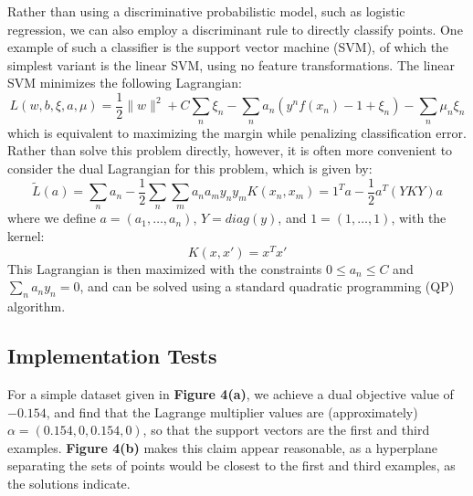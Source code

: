 \documentclass[10pt,psamsfonts]{amsart}
\theoremstyle{definition}
\theoremstyle{remark}
\numberwithin{equation}{section}
\begin{document}
Rather than using a discriminative probabilistic model, such as logistic regression, we can also employ a discriminant rule to directly classify points. One example of such a classifier is the support vector machine (SVM), of which the simplest variant is the linear SVM, using no feature transformations. The linear SVM minimizes the following Lagrangian:
$$L(w, b, \xi, a, \mu) = \frac{1}{2}\|w\|^2 + C\sum_n \xi_n - \sum_n a_n(y^n f(x_n) - 1+ \xi_n) - \sum_n \mu_n \xi_n$$
which is equivalent to maximizing the margin while penalizing classification error. Rather than solve this problem directly, however, it is often more convenient to consider the dual Lagrangian for this problem, which is given by:
$$\tilde{L}(a) = \sum_n a_n - \frac{1}{2} \sum_n \sum_m a_na_m y_ny_m K(x_n,x_m) = 1^T a - \frac{1}{2} a^T(YKY)a$$
where we define $a = (a_1, \dots, a_n)$, $Y = diag(y)$, and $1 = (1, \dots, 1)$, with the kernel:
$$K(x,x') = x^Tx'$$
This Lagrangian is then maximized with the constraints $0\leq a_n \leq C$ and $\sum_n a_ny_n = 0$, and can be solved using a standard quadratic programming (QP) algorithm.

\subsection{Implementation Tests} For a simple dataset given in {\bf Figure 4(a)}, we achieve a dual objective value of $-0.154$, and find that the Lagrange multiplier values are (approximately) $ \alpha = (0.154, 0, 0.154, 0)$, so that the support vectors are the first and third examples. {\bf Figure 4(b)} makes this claim appear reasonable, as a hyperplane separating the sets of points would be closest to the first and third examples, as the solutions indicate.
\end{document}
